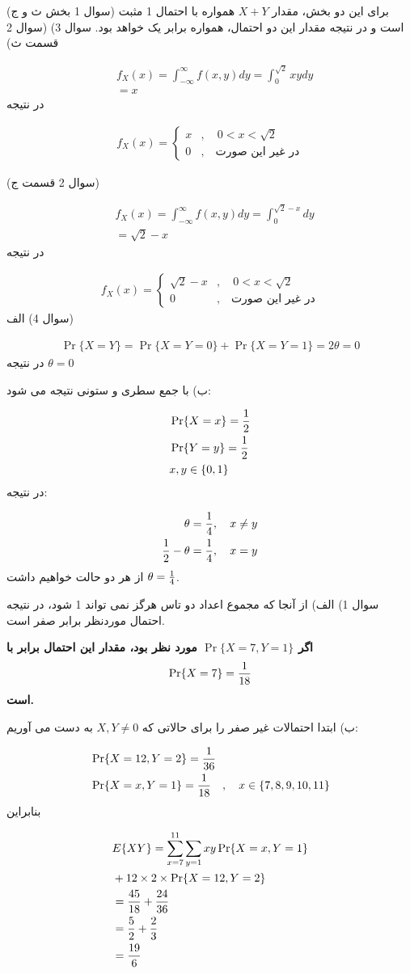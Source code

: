\documentclass[10pt,letterpaper]{report}
\newcommand{\eqn}[1]{
\[\begin{split}
#1
\end{split}\]
}
\begin{document}
(سوال 1 بخش ث و ج) برای این دو بخش، مقدار $X+Y$ همواره با احتمال 1 مثبت است و در نتیجه مقدار این دو احتمال، همواره برابر یک خواهد بود.
\newline
\newline
سوال 3) (سوال 2 قسمت ث)
\eqn{
&f_X(x)=\int_{-\infty}^\infty f(x,y)dy=\int_{0}^{\sqrt 2} xydy
\\&=x
}{}
در نتیجه
\eqn{
f_X(x)=\begin{cases}
x&,\quad 0<x<\sqrt2
\\0&,\quad \text{در غیر این صورت}
\end{cases}
}{}

(سوال 2 قسمت ج)
\eqn{
&f_X(x)=\int_{-\infty}^\infty f(x,y)dy=\int_{0}^{\sqrt 2-x} dy
\\&=\sqrt 2-x
}{}
در نتیجه
\eqn{
f_X(x)=\begin{cases}
\sqrt2-x&,\quad 0<x<\sqrt2
\\0&,\quad \text{در غیر این صورت}
\end{cases}
}{}
\newline\newline
سوال 4) الف)
\eqn{
\Pr\{X=Y\}=\Pr\{X=Y=0\}+\Pr\{X=Y=1\}=2\theta=0
}{}
در نتیجه $\theta=0$

ب) با جمع سطری و ستونی نتیجه می شود:
\eqn{
&\Pr\{X=x\}={1\over 2}
\\&\Pr\{Y=y\}={1\over 2}
\\& x,y\in\{0,1\}
}{}
 در نتیجه:
\eqn{
\theta={1\over 4}&,\quad x\ne y
\\{1\over 2}-\theta={1\over 4}&,\quad x=y
}{}
از هر دو حالت خواهیم داشت $\theta={1\over 4}$.

سوال 1) الف) از آنجا که مجموع اعداد دو تاس هرگز نمی تواند 1 شود، در نتیجه احتمال موردنظر برابر صفر است.

\textbf{
اگر 
$
\Pr\{X=7,Y=1\}
$
 مورد نظر بود، مقدار این احتمال برابر با 
$$
\Pr\{X=7\}={1\over 18}
$$
 است.
}

ب) ابتدا احتمالات غیر صفر را برای حالاتی که $X,Y\ne 0$ به دست می آوریم:
\eqn{
&\Pr\{X=12,Y=2\}={1\over 36}
\\&\Pr\{X=x,Y=1\}={1\over 18}\quad,\quad x\in\{7,8,9,10,11\}
}{}
بنابراین
\eqn{
&E\{XY\}=\sum_{x=7}^{11}\sum_{y=1}xy\Pr\{X=x,Y=1\}
\\&+12\times 2\times\Pr\{X=12,Y=2\}
\\&={45\over 18}+{24\over 36}
\\&={5\over 2}+{2\over 3}
\\&={19\over 6}
}{}
\end{document}
